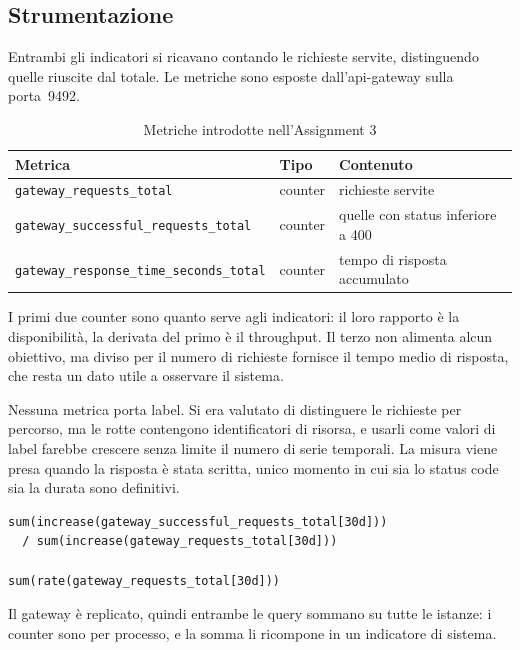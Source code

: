 \documentclass[12pt,a4paper]{article}
\begin{document}
\subsection{Strumentazione}

Entrambi gli indicatori si ricavano contando le richieste servite, distinguendo quelle riuscite dal
totale. Le metriche sono esposte dall'api-gateway sulla porta~9492.

\begin{table}[H]
\centering
\caption{Metriche introdotte nell'Assignment 3}
\begin{tabularx}{\textwidth}{llX}
\toprule
\textbf{Metrica} & \textbf{Tipo} & \textbf{Contenuto} \\
\midrule
\texttt{gateway\_requests\_total} & counter & richieste servite \\
\texttt{gateway\_successful\_requests\_total} & counter & quelle con status inferiore a 400 \\
\texttt{gateway\_response\_time\_seconds\_total} & counter & tempo di risposta accumulato \\
\bottomrule
\end{tabularx}
\end{table}

I primi due counter sono quanto serve agli indicatori: il loro rapporto \`e la disponibilit\`a, la
derivata del primo \`e il throughput. Il terzo non alimenta alcun obiettivo, ma diviso per il numero
di richieste fornisce il tempo medio di risposta, che resta un dato utile a osservare il sistema.

Nessuna metrica porta label. Si era valutato di distinguere le richieste per percorso, ma le rotte
contengono identificatori di risorsa, e usarli come valori di label farebbe crescere senza limite il
numero di serie temporali. La misura viene presa quando la risposta \`e stata scritta, unico momento
in cui sia lo status code sia la durata sono definitivi.

\begin{lstlisting}[caption={Le due query PromQL degli indicatori}]
sum(increase(gateway_successful_requests_total[30d]))
  / sum(increase(gateway_requests_total[30d]))

sum(rate(gateway_requests_total[30d]))
\end{lstlisting}

Il gateway \`e replicato, quindi entrambe le query sommano su tutte le istanze: i counter sono per
processo, e la somma li ricompone in un indicatore di sistema.
\end{document}
